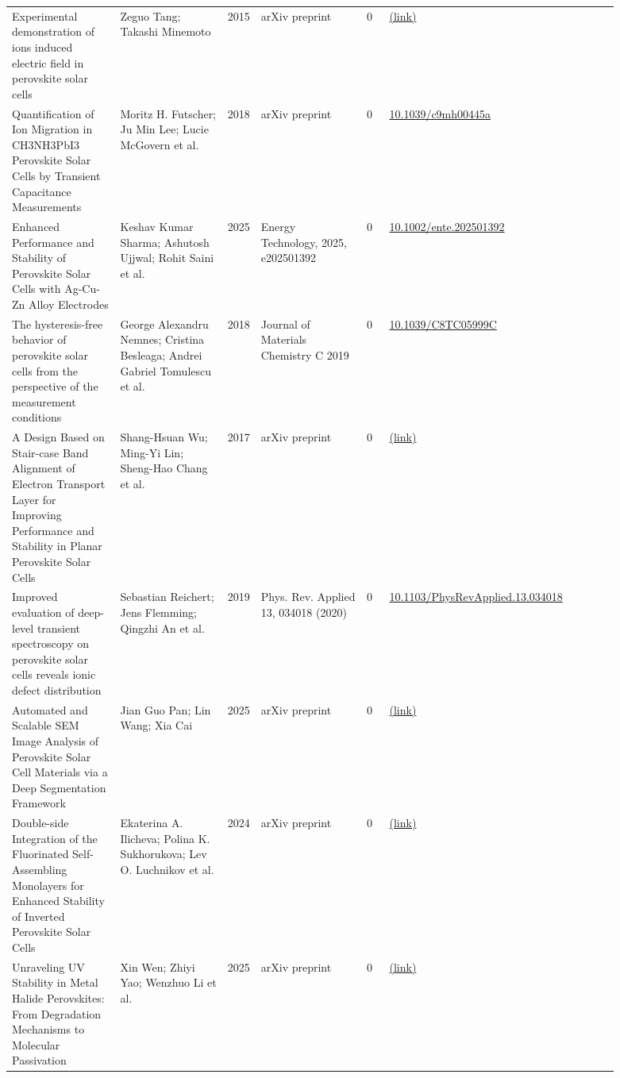 \documentclass[10pt,a4paper]{article}
\begin{document}
{\begin{longtable}{p{0.197\linewidth}p{0.197\linewidth}p{0.043\linewidth}p{0.197\linewidth}p{0.043\linewidth}p{0.117\linewidth}p{0.098\linewidth}}
Experimental demonstration of ions induced electric field in perovskite solar cells & Zeguo Tang; Takashi Minemoto & 2015 & arXiv preprint & 0 & \href{http://arxiv.org/abs/1508.05491v1}{(link)} &  \\
Quantification of Ion Migration in CH3NH3PbI3 Perovskite Solar Cells by Transient Capacitance Measurements & Moritz H. Futscher; Ju Min Lee; Lucie McGovern et al. & 2018 & arXiv preprint & 0 & \href{https://doi.org/10.1039/c9mh00445a}{10.1039/c9mh00445a} &  \\
Enhanced Performance and Stability of Perovskite Solar Cells with Ag-Cu-Zn Alloy Electrodes & Keshav Kumar Sharma; Ashutosh Ujjwal; Rohit Saini et al. & 2025 & Energy Technology, 2025, e202501392 & 0 & \href{https://doi.org/10.1002/ente.202501392}{10.1002/ente.202501392} &  \\
The hysteresis-free behavior of perovskite solar cells from the perspective of the measurement conditions & George Alexandru Nemnes; Cristina Besleaga; Andrei Gabriel Tomulescu et al. & 2018 & Journal of Materials Chemistry C 2019 & 0 & \href{https://doi.org/10.1039/C8TC05999C}{10.1039/C8TC05999C} &  \\
A Design Based on Stair-case Band Alignment of Electron Transport Layer for Improving Performance and Stability in Planar Perovskite Solar Cells & Shang-Hsuan Wu; Ming-Yi Lin; Sheng-Hao Chang et al. & 2017 & arXiv preprint & 0 & \href{http://arxiv.org/abs/1708.03153v1}{(link)} &  \\
Improved evaluation of deep-level transient spectroscopy on perovskite solar cells reveals ionic defect distribution & Sebastian Reichert; Jens Flemming; Qingzhi An et al. & 2019 & Phys. Rev. Applied 13, 034018 (2020) & 0 & \href{https://doi.org/10.1103/PhysRevApplied.13.034018}{10.1103/PhysRevApplied.13.034018} &  \\
Automated and Scalable SEM Image Analysis of Perovskite Solar Cell Materials via a Deep Segmentation Framework & Jian Guo Pan; Lin Wang; Xia Cai & 2025 & arXiv preprint & 0 & \href{http://arxiv.org/abs/2509.26548v1}{(link)} &  \\
Double-side Integration of the Fluorinated Self-Assembling Monolayers for Enhanced Stability of Inverted Perovskite Solar Cells & Ekaterina A. Ilicheva; Polina K. Sukhorukova; Lev O. Luchnikov et al. & 2024 & arXiv preprint & 0 & \href{http://arxiv.org/abs/2407.20690v1}{(link)} &  \\
Unraveling UV Stability in Metal Halide Perovskites: From Degradation Mechanisms to Molecular Passivation & Xin Wen; Zhiyi Yao; Wenzhuo Li et al. & 2025 & arXiv preprint & 0 & \href{http://arxiv.org/abs/2511.22136v1}{(link)} &  \\

\end{longtable}}
\end{document}
